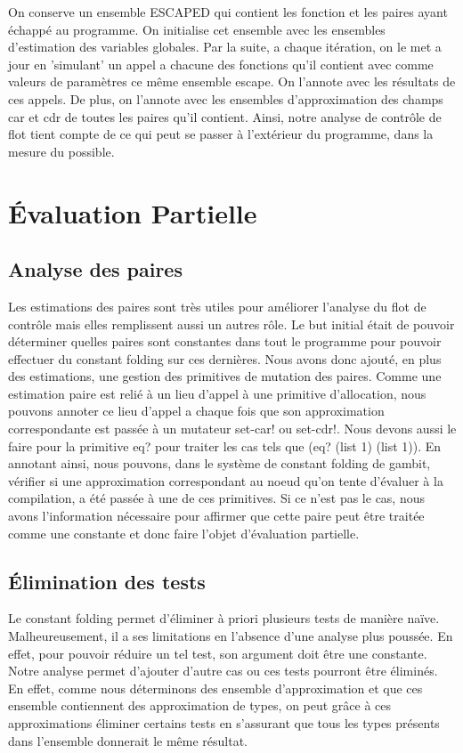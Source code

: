 On conserve un ensemble ESCAPED qui contient les fonction et les
paires ayant échappé au programme. On initialise cet ensemble avec les
ensembles d'estimation des variables globales. Par la suite, a chaque
itération, on le met a jour en 'simulant' un appel a chacune des
fonctions qu'il contient avec comme valeurs de paramètres ce même
ensemble escape. On l'annote avec les résultats de ces appels. De
plus, on l'annote avec les ensembles d'approximation des champs car et
cdr de toutes les paires qu'il contient. Ainsi, notre analyse de
contrôle de flot tient compte de ce qui peut se passer à l'extérieur
du programme, dans la mesure du possible.


\section{Évaluation Partielle}

\subsection{Analyse des paires}

Les estimations des paires sont très utiles pour améliorer l'analyse
du flot de contrôle mais elles remplissent aussi un autres rôle. Le
but initial était de pouvoir déterminer quelles paires sont constantes
dans tout le programme pour pouvoir effectuer du constant folding sur
ces dernières. Nous avons donc ajouté, en plus des estimations, une
gestion des primitives de mutation des paires. Comme une estimation
paire est relié à un lieu d'appel à une primitive d'allocation, nous
pouvons annoter ce lieu d'appel a chaque fois que son approximation
correspondante est passée à un mutateur set-car! ou set-cdr!. Nous
devons aussi le faire pour la primitive eq?  pour traiter les cas tels
que (eq? (list 1) (list 1)). En annotant ainsi, nous pouvons, dans le
système de constant folding de gambit, vérifier si une approximation
correspondant au noeud qu'on tente d'évaluer à la compilation, a été
passée à une de ces primitives. Si ce n'est pas le cas, nous avons
l'information nécessaire pour affirmer que cette paire peut être
traitée comme une constante et donc faire l'objet d'évaluation
partielle.

\subsection{Élimination des tests}

Le constant folding permet d'éliminer à priori plusieurs tests de
manière naïve. Malheureusement, il a ses limitations en l'absence
d'une analyse plus poussée. En effet, pour pouvoir réduire un tel
test, son argument doit être une constante.  Notre analyse permet
d'ajouter d'autre cas ou ces tests pourront être éliminés. En effet,
comme nous déterminons des ensemble d'approximation et que ces
ensemble contiennent des approximation de types, on peut grâce à ces
approximations éliminer certains tests en s'assurant que tous les
types présents dans l'ensemble donnerait le même résultat.

